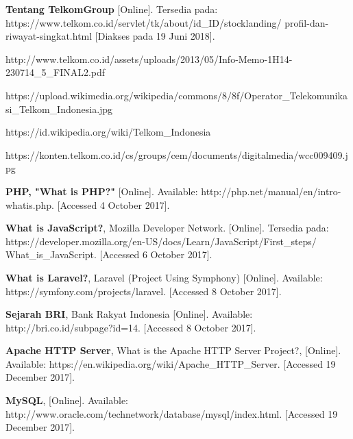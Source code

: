 \begin{thebibliography}{9}
	
	\textbf {Tentang TelkomGroup} [Online]. Tersedia pada: https://www.telkom.co.id/servlet/tk/about/id\_ID/stocklanding/
	profil-dan-riwayat-singkat.html [Diakses pada 19 Juni 2018].
	
	http://www.telkom.co.id/assets/uploads/2013/05/Info-Memo-1H14-230714\_5\_FINAL2.pdf
	
	https://upload.wikimedia.org/wikipedia/commons/8/8f/Operator\_Telekomunikasi\_Telkom\_Indonesia.jpg
	
	https://id.wikipedia.org/wiki/Telkom\_Indonesia
	
	https://konten.telkom.co.id/cs/groups/cem/documents/digitalmedia/wcc009409.jpg
	
	\textbf{PHP, "What is PHP?"} [Online]. Available: http://php.net/manual/en/intro-whatis.php. [Accessed 4 October 2017].		
	
	\textbf{What is JavaScript?}, Mozilla Developer Network. [Online]. Tersedia pada: https://developer.mozilla.org/en-US/docs/Learn/JavaScript/First\_steps/
	What\_is\_JavaScript. [Accessed 6 October 2017].
	
	\textbf{What is Laravel?}, Laravel (Project Using Symphony) [Online]. Available: https://symfony.com/projects/laravel. [Accessed 8 October 2017].
	
	\textbf {Sejarah BRI}, Bank Rakyat Indonesia [Online]. Available: http://bri.co.id/subpage?id=14. [Accessed 8 October 2017].
	
	\textbf {Apache HTTP Server}, What is the Apache HTTP Server Project?, [Online]. Available: https://en.wikipedia.org/wiki/Apache\_HTTP\_Server. [Accessed 19 December 2017].
	
	\textbf{MySQL}, [Online]. Available: http://www.oracle.com/technetwork/database/mysql/index.html. [Accessed 19 December 2017].
\end{thebibliography}
